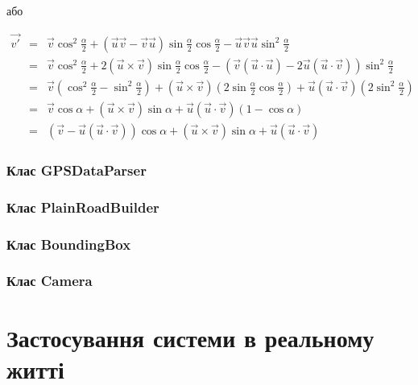 \documentclass[simple,a4paper,14pt,ukrainian,utf8]{eskdtext}
\begin{document}
            або

            \begin{displaymath}
                \begin{array}{lll}
                    \vec{v'} &=& \vec{v} \cos^2 \frac{\alpha}{2} + (\vec{u}\vec{v} - \vec{v}\vec{u}) \sin \frac{\alpha}{2} \cos \frac{\alpha}{2} - \vec{u}\vec{v}\vec{u} \sin^2 \frac{\alpha}{2} \\
                    &=& \vec{v} \cos^2 \frac{\alpha}{2} + 2 (\vec{u} \times \vec{v}) \sin \frac{\alpha}{2} \cos \frac{\alpha}{2} - (\vec{v} (\vec{u} \cdot \vec{u}) - 2 \vec{u} (\vec{u} \cdot \vec{v})) \sin^2 \frac{\alpha}{2} \\
                    &=& \vec{v} (\cos^2 \frac{\alpha}{2} - \sin^2 \frac{\alpha}{2}) + (\vec{u} \times \vec{v}) (2 \sin \frac{\alpha}{2} \cos \frac{\alpha}{2}) + \vec{u} (\vec{u} \cdot \vec{v}) (2 \sin^2 \frac{\alpha}{2}) \\
                    &=& \vec{v} \cos \alpha + (\vec{u} \times \vec{v}) \sin \alpha + \vec{u} (\vec{u} \cdot \vec{v}) (1 - \cos \alpha) \\
                    &=& (\vec{v} - \vec{u} (\vec{u} \cdot \vec{v})) \cos \alpha + (\vec{u} \times \vec{v}) \sin \alpha + \vec{u} (\vec{u} \cdot \vec{v})
                \end{array}
            \end{displaymath}

        \subsubsection{Клас GPSDataParser}

        \subsubsection{Клас PlainRoadBuilder}
        
        \subsubsection{Клас BoundingBox}

        \subsubsection{Клас Camera}
        
    \newpage \section{Застосування системи в реальному житті}
\end{document}
